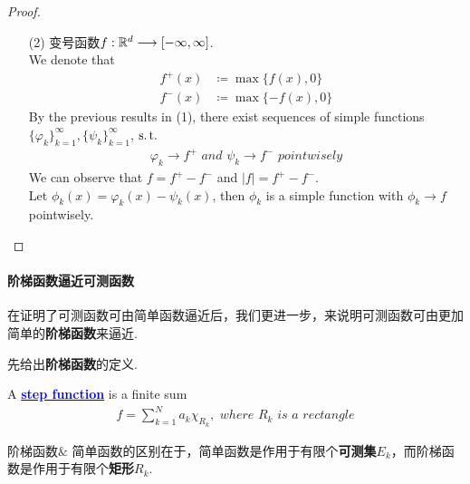 \begin{thm}
\begin{proof}
\begin{enumerate}
				\item[(2)]变号函数$f : \mathbb{R}^d \longrightarrow [-\infty , \infty]$.\\
				We denote that
				\begin{align}
					f^{+}(x) &\coloneqq \max{\{ f(x) , 0 \}} \\
					f^{-}(x) &\coloneqq \max{\{ -f(x) , 0 \}}
				\end{align}
				By the previous results in (1), there exist sequences of simple functions $\{ \varphi_k \}_{k = 1}^{\infty} , \{ \psi_k \}_{k = 1}^{\infty}$, $\operatorname{s.t.}$
				\begin{align}
					\varphi_k \to f^{+} \,\, and \,\, \psi_{k} \to f^{-} \,\, pointwisely
				\end{align}
				We can observe that $f = f^+ - f^-$ and $\left| f \right| = f^+ - f^-$.\\
				Let $\phi_{k}(x) = \varphi_{k}(x) - \psi_{k}(x)$, then $\phi_k$ is a simple function with $\phi_k \to f$ pointwisely.
			\end{enumerate}
		\end{proof}
	\end{thm}

\newpage
\paragraph{阶梯函数逼近可测函数}
	在证明了可测函数可由简单函数逼近后，我们更进一步，来说明可测函数可由更加简单的\textbf{阶梯函数}来逼近.
	
	\vspace{2em}
	先给出\textbf{阶梯函数}的定义.
	\begin{defn}\label{def 2.2.3}
		A \underline{\textcolor{blue}{\textbf{step function}}} is a finite sum
		\begin{align}
			f = \sum_{k = 1}^{N}{a_{k} \chi_{R_k}} , \,\, where \,\, R_k \,\, is \,\, a \,\, rectangle
		\end{align}
	
		\begin{rmk}
			阶梯函数$\&$ 简单函数的区别在于，简单函数是作用于有限个\textbf{可测集$E_k$}，而阶梯函数是作用于有限个\textbf{矩形$R_k$}.
		\end{rmk}
	\end{defn}

